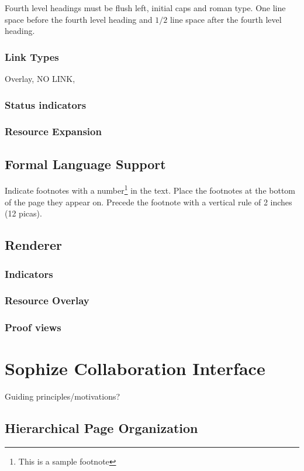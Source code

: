 \documentclass[a4paper]{article}
\begin{document}
Fourth level headings must be flush left, initial caps and roman type.
One line space before the fourth level heading and $1/2$ line
space after the fourth level heading.

\subsubsection{Link Types}
Overlay, NO LINK, 

\subsubsection{Status indicators}


\subsubsection{Resource Expansion}

\subsection{Formal Language Support}

Indicate footnotes with a number\footnote{This is a sample footnote} in
the text. Place the footnotes at the bottom of the page they appear on.
Precede the footnote with a vertical rule of 2 inches (12 picas).

\subsection{Renderer}
\subsubsection{ Indicators }
\subsubsection{ Resource Overlay }
\subsubsection{ Proof views }

\section{Sophize Collaboration Interface}
Guiding principles/motivations?
\subsection{Hierarchical Page Organization}
\end{document}
